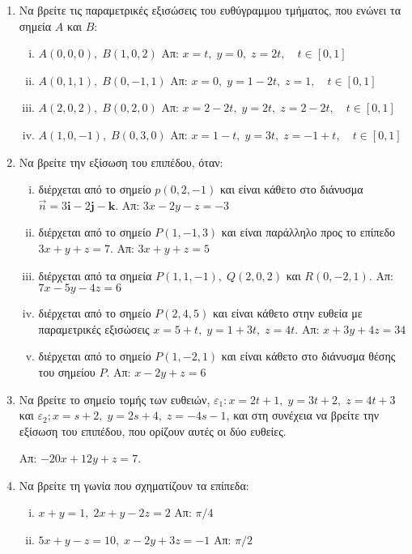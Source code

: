 \documentclass[a4paper,table]{report}
\begin{document}
\begin{enumerate}
  \item Να βρείτε τις παραμετρικές εξισώσεις του ευθύγραμμου τμήματος, που ενώνει 
    τα σημεία $A$ και $B$:
    \begin{enumerate}[i)]
      \item $ A(0,0,0), \; B(1,0,2) $ \hfill Απ: $ x=t, \; y=0, \; z=2t, \quad t \in
        [0,1] $  
      \item $ A(0,1,1), \; B(0,-1,1) $ \hfill Απ: $ x=0, \; y=1-2t, \; z=1, \quad t \in
        [0,1] $ 
      \item $ A(2,0,2), \; B(0,2,0) $ \hfill Απ: $ x=2-2t, \; y=2t, \; z=2-2t, 
        \quad t \in [0,1] $ 
      \item $ A(1,0,-1), \; B(0,3,0) $ \hfill Απ: $ x=1-t, \; y=3t, \; z=-1+t, 
        \quad t \in [0,1] $ 
    \end{enumerate}

  \item Να βρείτε την εξίσωση του επιπέδου, όταν:
    \begin{enumerate}[i)]
      \item διέρχεται από το σημείο $ p(0,2,-1) $ και είναι κάθετο στο διάνυσμα 
        $ \vec{n} = 3 \mathbf{i}-2 \mathbf{j}- \mathbf{k} $. 
        \hfill Απ: $ 3x-2y-z=-3 $ 

      \item διέρχεται από το σημείο $ P(1,-1,3) $ και είναι παράλληλο προς το επίπεδο 
        $ 3x+y+z=7 $.
        \hfill Απ: $ 3x+y+z=5 $  

      \item διέρχεται από τα σημεία $ P(1,1,-1), \; Q(2,0,2) $ και $ R(0,-2,1) $.
        \hfill Απ: $ 7x-5y-4z=6 $ 

      \item διέρχεται από το σημείο $ P(2,4,5) $ και είναι κάθετο στην ευθεία με
        παραμετρικές εξισώσεις $ x=5+t, \; y=1+3t, \; z=4t $.
        \hfill Απ: $ x+3y+4z=34 $ 

      \item διέρχεται από το σημείο $ P(1,-2,1) $ και είναι κάθετο στο διάνυσμα θέσης 
        του σημείου $ P $.
        \hfill Απ: $ x-2y+z=6 $ 
    \end{enumerate}

  \item Να βρείτε το σημείο τομής των ευθειών, $ \varepsilon _{1}: x=2t+1, \; y=3t+2, \;
    z=4t+3$ και $ \varepsilon _{2}; x=s+2, \; y=2s+4, \; z=-4s-1 $, και στη συνέχεια να 
    βρείτε την εξίσωση του επιπέδου, που ορίζουν αυτές οι δύο ευθείες.

    \hfill Απ: $ -20x+12y+z=7 $. 
    
  \item Να βρείτε τη γωνία που σχηματίζουν τα επίπεδα:
    \begin{enumerate}[i)]
      \item $ x+y=1, \; 2x+y-2z=2 $ \hfill Απ: $ \pi /4 $ 
      \item $5x+y-z=10, \; x-2y+3z=-1$ \hfill Απ: $ \pi /2 $ 
    \end{enumerate}
\end{enumerate}
\end{document}
